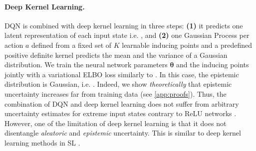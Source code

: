 \paragraph{Deep Kernel Learning.} DQN is combined with deep kernel learning \citep{due} in three steps: \textbf{(1)} it predicts one latent representation of each input state i.e. , and \textbf{(2)} one Gaussian Process per action $a$ defined from a fixed set of $K$ learnable inducing points  and a predefined positive definite kernel \smash{$\kappa(\cdot, \cdot)$} predicts the mean  and the variance  of a Gaussian distribution. We train the neural network parameters $\bm{\theta}$ and the inducing points  jointly with a variational ELBO loss similarly to \citep{due}. In this case, the epistemic distribution is Gaussian, i.e. . Indeed, we show \emph{theoretically} that epistemic uncertainty increases far from training data (see \cref{app:proofs}). Thus, the combination of DQN and deep kernel learning does not suffer from arbitrary uncertainty estimates for extreme input states contrary to ReLU networks \citep{overconfident-relu}. However, one of the limitation of deep kernel learning is that it does not disentangle \emph{aleatoric} and \emph{epistemic} uncertainty. This is similar to deep kernel learning methods in SL \citep{due, duq}.

